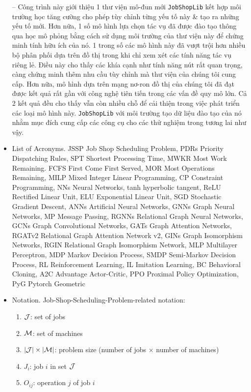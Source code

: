 \documentclass{article}
\begin{document}
\begin{itemize}
    -- Công trình này giới thiệu 1 thư viện mô-đun mới {\tt JobShopLib} kết hợp môi trường học tăng cường cho phép tùy chỉnh từng yếu tố này \& tạo ra những yếu tố mới. Hơn nữa, 1 số mô hình lựa chọn tác vụ đã được đào tạo thông qua học mô phỏng bằng cách sử dụng môi trường của thư viện này để chứng minh tính hữu ích của nó. 1 trong số các mô hình này đã vượt trội hơn nhiều bộ phân phối dựa trên đồ thị trong khi chỉ xem xét các tính năng tác vụ riêng lẻ. Điều này cho thấy các khía cạnh như tính năng nút rất quan trọng, càng chứng minh thêm nhu cầu tùy chỉnh mà thư viện của chúng tôi cung cấp. Hơn nữa, mô hình dựa trên mạng nơ-ron đồ thị của chúng tôi đã đạt được kết quả rất gần với công nghệ tiên tiến trong các vấn đề quy mô lớn. Cả 2 kết quả đều cho thấy vẫn còn nhiều chỗ để cải thiện trong việc phát triển các loại mô hình này. {\tt JobShopLib} với môi trường tạo dữ liệu đào tạo của nó nhằm mục đích cung cấp các công cụ cho các thử nghiệm trong tương lai như vậy.
    \item {\sf List of Acronyms.} JSSP Job Shop Scheduling Problem, PDRs Priority Dispatching Rules, SPT Shortest Processing Time, MWKR Most Work Remaining. FCFS First Come First Served, MOR Most Operations Remaining, MILP Mixed Integer Linear Programming, CP Constraint Programming, NNs Neural Networks, tanh hyperbolic tangent, ReLU Rectified Linear Unit, ELU Exponential Linear Unit, SGD Stochastic Gradient Descent, ANNs Artificial Neural Networks, GNNs Graph Neural Networks, MP Message Passing, RGNNs Relational Graph Neural Networks, GCNs Graph Convolutional Networks, GATs Graph Attention Networks, RGATv2 Relational Graph Attention Network v2, GINs Graph Isomorphism Networks, RGIN Relational Graph Isomorphism Network, MLP Multilayer Perceptron, MDP Markov Decision Process, SMDP Semi-Markov Decision Process, RL Reinforcement Learning, IL Imitation Learning, BC Behavioral Cloning, A2C Advantage Actor-Critic, PPO Proximal Policy Optimization, PyG Pytorch Geometric
    \item {\sf Notation.} Job-Shop-Scheduling-Problem-related notation:
    \begin{enumerate}
        \item ${\cal J}$: set of jobs
        \item ${\cal M}$: set of machines
        \item $|{\cal J}|\times|{\cal M}|$: problem size (number of jobs $\times$ number of machines)
        \item $J_i$: job $i$ in set ${\cal J}$
        \item $O_{ij}$: operation $j$ of job $i$

\end{enumerate}
\end{itemize}
\end{document}
